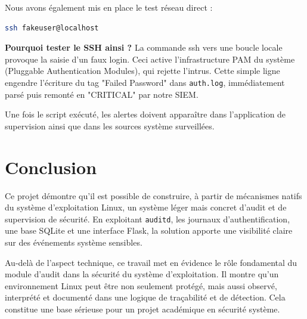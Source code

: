 \documentclass[12pt,a4paper]{article}
\begin{document}
Nous avons également mis en place le test réseau direct :
\begin{lstlisting}[language=bash]
ssh fakeuser@localhost
\end{lstlisting}

\textbf{Pourquoi tester le SSH ainsi ?}
La commande ssh vers une boucle locale provoque la saisie d'un faux login. Ceci active l'infrastructure PAM du système (Pluggable Authentication Modules), qui rejette l'intrus. Cette simple ligne engendre l'écriture du tag "Failed Password" dans \texttt{auth.log}, immédiatement parsé puis remonté en "CRITICAL" par notre SIEM.

Une fois le script exécuté, les alertes doivent apparaître dans l’application de supervision ainsi que dans les sources système surveillées.






\section{Conclusion}

Ce projet démontre qu’il est possible de construire, à partir de mécanismes natifs du système d’exploitation Linux, un système léger mais concret d’audit et de supervision de sécurité. En exploitant \texttt{auditd}, les journaux d’authentification, une base SQLite et une interface Flask, la solution apporte une visibilité claire sur des événements système sensibles.

Au-delà de l’aspect technique, ce travail met en évidence le rôle fondamental du module d’audit dans la sécurité du système d’exploitation. Il montre qu’un environnement Linux peut être non seulement protégé, mais aussi observé, interprété et documenté dans une logique de traçabilité et de détection. Cela constitue une base sérieuse pour un projet académique en sécurité système.
\end{document}
